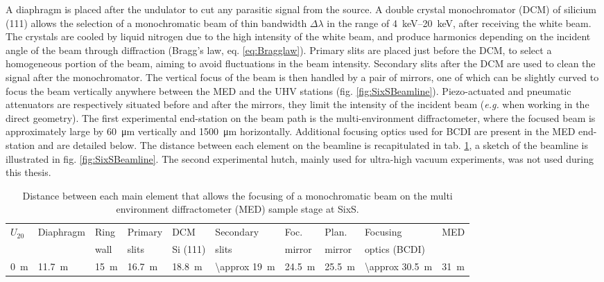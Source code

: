 A diaphragm is placed after the undulator to cut any parasitic signal from the source.
A double crystal monochromator (DCM) of silicium (111) allows the selection of a monochromatic beam of thin bandwidth $\Delta \lambda$ in the range of \qtyrange{4}{20}{\keV}, after receiving the white beam.
The crystals are cooled by liquid nitrogen due to the high intensity of the white beam, and produce harmonics depending on the incident angle of the beam through diffraction (Bragg's law, eq. \ref{eq:Bragglaw}).
Primary slits are placed just before the DCM, to select a homogeneous portion of the beam, aiming to avoid fluctuations in the beam intensity.
Secondary slits after the DCM are used to clean the signal after the monochromator.
The vertical focus of the beam is then handled by a pair of mirrors, one of which can be slightly curved to focus the beam vertically anywhere between the MED and the UHV stations (fig. \ref{fig:SixSBeamline}).
Piezo-actuated and pneumatic attenuators are respectively situated before and after the mirrors, they limit the intensity of the incident beam (\textit{e.g.} when working in the direct geometry).
The first experimental end-station on the beam path is the multi-environment diffractometer, where the focused beam is approximately large by \qty{60}{\um} vertically and \qty{1500}{\um} horizontally.
Additional focusing optics used for BCDI are present in the MED end-station and are detailed below.
The distance between each element on the beamline is recapitulated in tab. \ref{tab:DistanceSixS}, a sketch of the beamline is illustrated in fig. \ref{fig:SixSBeamline}.
The second experimental hutch, mainly used for ultra-high vacuum experiments, was not used during this thesis.

\begin{table}[!htb]
	\centering
    \small{
	\begin{tabular}{@{}llllllllll@{}}
	\toprule
	$U_{20}$ & Diaphragm & Ring    & Primary     & DCM         & Secondary       & Foc.      & Plan.     & Focusing      &  MED \\
	         &           & wall    & slits       & Si (111)    & slits           & mirror    & mirror    & optics (BCDI) &  \\
 	\midrule
 	\qty{0}{\m}&\qty{11.7}{\m}&\qty{15}{\m}&\qty{16.7}{\m}&\qty{18.8}{\m}&\qty{\approx 19}{\m}&\qty{24.5}{\m}&\qty{25.5}{\m}&\qty{\approx 30.5}{\m}&\qty{31}{\m}
	\end{tabular}
    }
	\caption{
		Distance between each main element that allows the focusing of a monochromatic beam on the multi environment diffractometer (MED) sample stage at SixS.
	}
    \label{tab:DistanceSixS}
\end{table}

